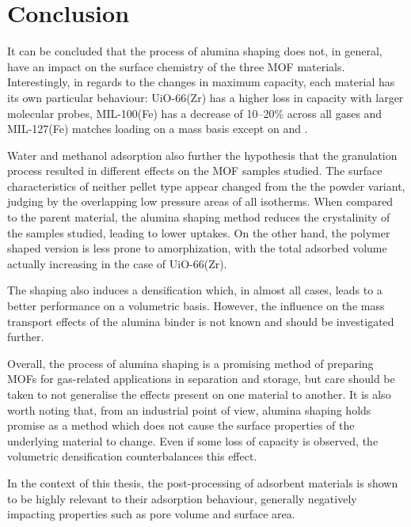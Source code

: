 
\pagebreak
\FloatBarrier%

\section{Conclusion}

It can be concluded that the process of alumina shaping does not, in 
general, have an impact on the surface chemistry of the three \gls{MOF}
materials. Interestingly, in regards to the changes in maximum capacity,
each material has its own particular behaviour: UiO-66(Zr) has a 
higher loss in capacity with larger molecular probes, MIL-100(Fe) 
has a decrease of 10--20\% across all gases and MIL-127(Fe) matches
loading on a mass basis except on  and .

Water and methanol adsorption also further the hypothesis that 
the granulation process resulted in different
effects on the \gls{MOF} samples studied. The surface 
characteristics of neither pellet type appear changed from the 
the powder variant, judging by the overlapping low pressure
areas of all isotherms. When compared to the parent material,
the alumina shaping method reduces 
the crystalinity of the samples studied, leading to lower uptakes.
On the other hand, the polymer shaped version is less prone to
amorphization, with the total adsorbed volume actually increasing
in the case of UiO-66(Zr).

The shaping also induces a densification which, in almost all cases,
leads to a better performance on a volumetric basis. However, the 
influence on the mass transport effects of the alumina binder is 
not known and should be investigated further. 

Overall, the process of alumina shaping is a promising method of 
preparing \glspl{MOF} for gas-related applications in separation and 
storage, but care should be taken to not generalise the effects
present on one material to another. It is also worth noting that,
from an industrial point of view, alumina shaping holds promise 
as a method which does not cause the surface properties of 
the underlying material to change. Even if some loss of capacity
is observed, the volumetric densification counterbalances this effect. 

In the context of this thesis, the post-processing of adsorbent
materials is shown to be highly relevant to their adsorption behaviour,
generally negatively impacting properties such as pore volume and surface
area. 

\pagebreak
